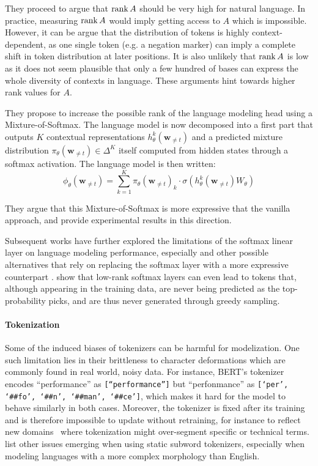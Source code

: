They proceed to argue that $\operatorname{rank} A$ should be very high for natural language. In practice, measuring $\operatorname{rank} A$ would imply getting access to $A$ which is impossible. However, it can be argue that the distribution of tokens is highly context-dependent, as one single token (e.g. a negation marker) can imply a complete shift in token distribution at later positions. It is also unlikely that $\operatorname{rank} A$ is low as it does not seem plausible that only a few hundred of bases can express the whole diversity of contexts in language. These arguments hint towards higher rank values for $A$.

They propose to increase the possible rank of the language modeling head using a Mixture-of-Softmax. The language model is now decomposed into a first part that outputs $K$ contextual representations $h^k_\theta(\mathbf{w}_{\neq t})$ and a predicted mixture distribution $\pi_\theta(\mathbf{w}_{\neq t}) \in \Delta^K$ itself computed from hidden states through a softmax activation. The language model is then written:
$$
\phi_\theta(\mathbf{w}_{\neq t}) = \sum_{k=1}^K \pi_\theta(\mathbf{w}_{\neq t})_k \cdot \sigma (h^k_\theta(\mathbf{w}_{\neq t}) W_\theta)
$$

They argue that this Mixture-of-Softmax is more expressive that the vanilla approach, and provide experimental results in this direction.

Subsequent works have further explored the limitations of the softmax linear layer on language modeling performance, especially  \citep{chang-mccallum-2022-softmax} and other possible alternatives that rely on replacing the softmax layer with a more expressive counterpart \citep{lin2021breaking,sigsoftmax}. \citet{grivas-etal-2022-low} show that low-rank softmax layers can even lead to tokens that, although appearing in the training data, are never being predicted as the top-probability picks, and are thus never generated through greedy sampling.

\paragraph*{Tokenization}

Some of the induced biases of tokenizers can be harmful for modelization. One such limitation lies in their brittleness to character deformations which are commonly found in real world, noisy data. For instance, BERT's tokenizer~\cite{devlin-etal-2019-bert} encodes ``performance'' as \texttt{[``performance'']} but \mbox{``perfonmance''} as \texttt{[`per', `\#\#fo', `\#\#n', `\#\#man', `\#\#ce']}, which makes it hard for the model to behave similarly in both cases. Moreover, the tokenizer is fixed after its training and is therefore impossible to update without retraining, for instance to reflect new domains~\cite{el-boukkouri-etal-2020-characterbert} where tokenization might over-segment specific or technical terms. \citet{clark2022canine} list other issues emerging when using static subword tokenizers, especially when modeling languages with a more complex morphology than English.

